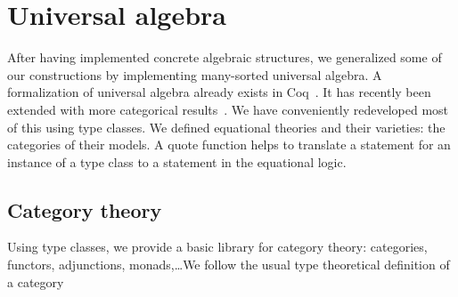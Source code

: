 \documentclass[a4paper,10pt, runningheads]{llncs}
\begin{document}
\section{Universal algebra}\label{univ}
After having implemented concrete algebraic structures, we generalized some of our constructions
by implementing many-sorted universal algebra. A formalization of universal algebra
already exists in Coq~\cite{DBLP:conf/tphol/Capretta99}. It has recently been extended with more
categorical results~\cite{dominguez2008formalizing}. We have conveniently redeveloped most of this
using type classes. We defined equational theories and their varieties:
the categories of their models. A quote function helps to translate a statement for an instance of
a type class to a statement in the equational logic.

\subsection{Category theory}\label{cats}
Using type classes, we provide a basic library for category theory: categories, functors,
adjunctions, monads,\ldots We follow the usual type theoretical definition of a category~\cite{saibi1995constructive}
\end{document}
